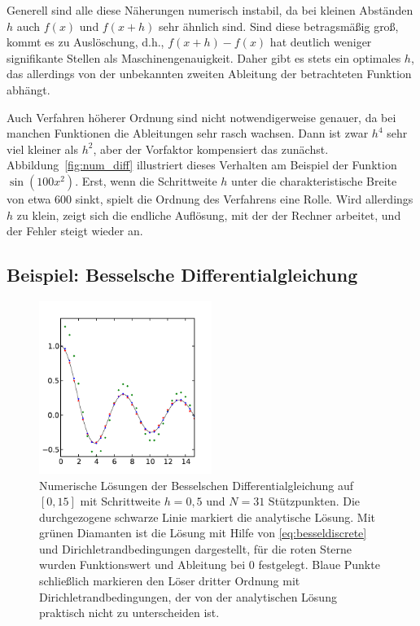 Generell sind alle diese Näherungen numerisch instabil, da bei kleinen
Abständen $h$ auch $f(x)$ und $f(x+h)$ sehr ähnlich sind. Sind diese
betragsmäßig groß, kommt es zu Auslöschung, d.h., $f(x+h) - f(x)$ hat
deutlich weniger signifikante Stellen als Maschinengenauigkeit. Daher
gibt es stets ein optimales $h$, das allerdings von der unbekannten
zweiten Ableitung der betrachteten Funktion abhängt.

Auch Verfahren höherer Ordnung sind nicht notwendigerweise genauer, da
bei manchen Funktionen die Ableitungen sehr rasch wachsen. Dann ist
zwar $h^4$ sehr viel kleiner als $h^2$, aber der Vorfaktor
kompensiert das zunächst. Abbildung~\ref{fig:num_diff} illustriert
dieses Verhalten am Beispiel der Funktion $\sin(100x^2)$. Erst, wenn
die Schrittweite $h$ unter die charakteristische Breite von etwa 600
sinkt, spielt die Ordnung des Verfahrens eine Rolle. Wird allerdings
$h$ zu klein, zeigt sich die endliche Auflösung, mit der der Rechner
arbeitet, und der Fehler steigt wieder an.

\subsection{Beispiel: Besselsche Differentialgleichung}

\begin{figure}
  \centering
  \includegraphics[width=0.5\textwidth]{plots/bessel_diff}
  \caption{Numerische Lösungen der Besselschen Differentialgleichung
    auf $[0,15]$ mit Schrittweite $h=0,5$ und $N=31$ Stützpunkten. Die
    durchgezogene schwarze Linie markiert die analytische Lösung. Mit
    grünen Diamanten ist die Lösung mit Hilfe von
    \eqref{eq:besseldiscrete} und Dirichletrandbedingungen
    dargestellt, für die roten Sterne wurden Funktionswert und
    Ableitung bei $0$ festgelegt. Blaue Punkte schließlich markieren
    den Löser dritter Ordnung mit Dirichletrandbedingungen, der von
    der analytischen Lösung praktisch nicht zu unterscheiden ist.}
  \label{fig:bessel_diff}
\end{figure}

